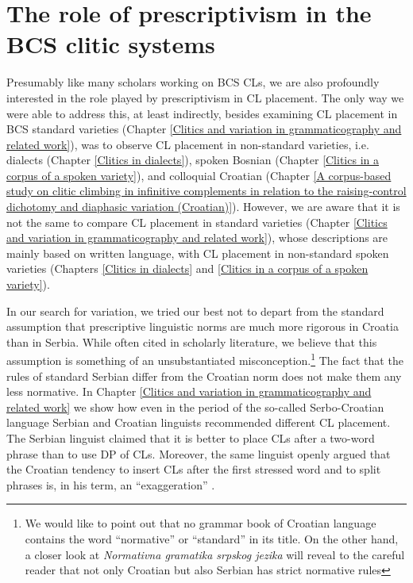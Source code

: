\section{The role of prescriptivism in the BCS clitic systems}
\label{The role of prescriptivism in the BCS CL systems}
Presumably like many scholars working on BCS CLs, we are also profoundly interested in the role played by prescriptivism in CL placement. The only way we were able to address this, at least indirectly, besides examining CL placement in BCS standard varieties (Chapter \ref{Clitics and variation in grammaticography and related work}), was to observe CL placement in non-standard varieties, i.e. dialects (Chapter \ref{Clitics in dialects}), spoken Bosnian (Chapter \ref{Clitics in a corpus of a spoken variety}), and colloquial Croatian (Chapter \ref{A corpus-based study on clitic climbing in infinitive complements in relation to the raising-control dichotomy and diaphasic variation (Croatian)}). However, we are aware that it is not the same to compare CL placement in standard varieties (Chapter \ref{Clitics and variation in grammaticography and related work}), whose descriptions are mainly based on written language, with CL placement in non-standard spoken varieties (Chapters \ref{Clitics in dialects} and \ref{Clitics in a corpus of a spoken variety}).

In our search for variation, we tried our best not to depart from the standard assumption that prescriptive linguistic norms are much more rigorous in Croatia than in Serbia. While often cited in scholarly literature, we believe that this assumption is something of an unsubstantiated misconception.\footnote{We would like to point out that no grammar book of Croatian language contains the word ``normative'' or ``standard'' in its title. On the other hand, a closer look at \textit{Normativna gramatika srpskog jezika} \citep{PiperKlajn14} will reveal to the careful reader that not only Croatian but also Serbian has strict normative rules} The fact that the rules of standard Serbian differ from the Croatian norm does not make them any less normative. In Chapter \ref{Clitics and variation in grammaticography and related work} we show how even in the period of the so-called Serbo-Croatian language Serbian and Croatian linguists recommended different CL placement. The Serbian linguist \citet[308]{Pesikan58} claimed that it is better to place CLs after a two-word phrase than to use DP of CLs. Moreover, the same linguist openly argued that the Croatian tendency to insert CLs after the first stressed word and to split phrases is, in his term, an ``exaggeration'' \citep[cf.][309]{Pesikan58}.


